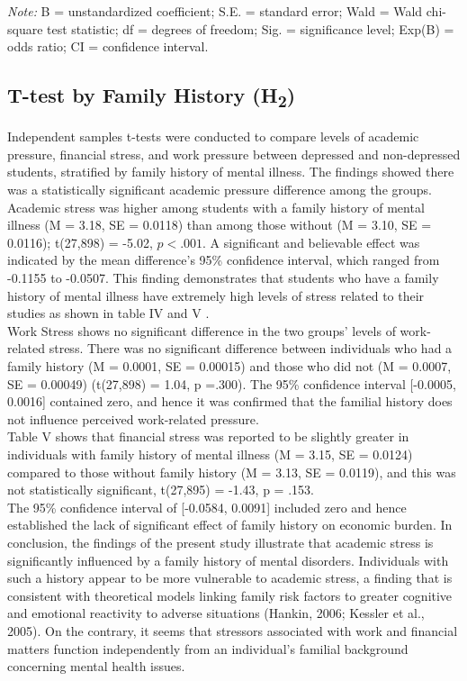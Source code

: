 \documentclass[conference]{IEEEtran}
\begin{document}
\vspace{1mm}
\noindent\textit{Note:} B = unstandardized coefficient; S.E. = standard error; Wald = Wald chi-square test statistic; df = degrees of freedom; Sig. = significance level; Exp(B) = odds ratio; CI = confidence interval.


\subsection{T-test by Family History (H\textsubscript{2})}
Independent samples t-tests were conducted to compare levels of academic pressure, financial stress, and work pressure between depressed and non-depressed students, stratified by family history of mental illness.
The findings showed there was a statistically significant academic pressure difference among the groups. Academic stress was higher among students with a family history of mental illness (M = 3.18, SE = 0.0118) than among those without (M = 3.10, SE = 0.0116); t(27,898) = -5.02, $p <.001$. A significant and believable effect was indicated by the mean difference's 95\% confidence interval, which ranged from -0.1155 to -0.0507. This finding demonstrates that students who have a family history of mental illness have extremely high levels of stress related to their studies as shown in table IV and V . \\
Work Stress shows no significant difference in the two groups' levels of work-related stress. There was no significant difference between individuals who had a family history (M = 0.0001, SE = 0.00015) and those who did not (M = 0.0007, SE = 0.00049) (t(27,898) = 1.04, p =.300). The 95\% confidence interval [-0.0005, 0.0016] contained zero, and hence it was confirmed that the familial history does not influence perceived work-related pressure. \\
Table V shows that financial stress was reported to be slightly greater in individuals with family history of mental illness (M = 3.15, SE = 0.0124) compared to those without family history (M = 3.13, SE = 0.0119), and this was not statistically significant, t(27,895) = -1.43, p = .153. \\
The 95\% confidence interval of [-0.0584, 0.0091] included zero and hence established the lack of significant effect of family history on economic burden. In conclusion, the findings of the present study illustrate that academic stress is significantly influenced by a family history of mental disorders. Individuals with such a history appear to be more vulnerable to academic stress, a finding that is consistent with theoretical models linking family risk factors to greater cognitive and emotional reactivity to adverse situations (Hankin, 2006; Kessler et al., 2005). On the contrary, it seems that stressors associated with work and financial matters function independently from an individual's familial background concerning mental health issues.
\end{document}

